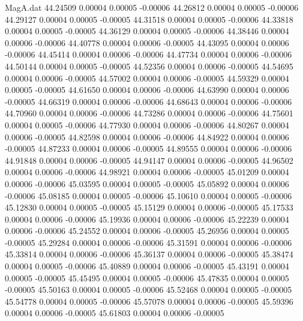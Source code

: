 \begin{filecontents}{MagA.dat}
  44.24509    0.00004    0.00005   -0.00006
  44.26812    0.00004    0.00005   -0.00006
  44.29127    0.00004    0.00005   -0.00005
  44.31518    0.00004    0.00005   -0.00006
  44.33818    0.00004    0.00005   -0.00005
  44.36129    0.00004    0.00005   -0.00006
  44.38446    0.00004    0.00006   -0.00006
  44.40778    0.00004    0.00006   -0.00005
  44.43095    0.00004    0.00006   -0.00006
  44.45414    0.00004    0.00006   -0.00006
  44.47734    0.00004    0.00006   -0.00006
  44.50144    0.00004    0.00005   -0.00005
  44.52356    0.00004    0.00006   -0.00005
  44.54695    0.00004    0.00006   -0.00005
  44.57002    0.00004    0.00006   -0.00005
  44.59329    0.00004    0.00005   -0.00005
  44.61650    0.00004    0.00006   -0.00006
  44.63990    0.00004    0.00006   -0.00005
  44.66319    0.00004    0.00006   -0.00006
  44.68643    0.00004    0.00006   -0.00006
  44.70960    0.00004    0.00006   -0.00006
  44.73286    0.00004    0.00006   -0.00006
  44.75601    0.00004    0.00005   -0.00006
  44.77930    0.00004    0.00006   -0.00006
  44.80267    0.00004    0.00006   -0.00005
  44.82598    0.00004    0.00006   -0.00006
  44.84922    0.00004    0.00006   -0.00005
  44.87233    0.00004    0.00006   -0.00005
  44.89555    0.00004    0.00006   -0.00006
  44.91848    0.00004    0.00006   -0.00005
  44.94147    0.00004    0.00006   -0.00005
  44.96502    0.00004    0.00006   -0.00006
  44.98921    0.00004    0.00006   -0.00005
  45.01209    0.00004    0.00006   -0.00006
  45.03595    0.00004    0.00005   -0.00005
  45.05892    0.00004    0.00006   -0.00006
  45.08185    0.00004    0.00005   -0.00006
  45.10610    0.00004    0.00005   -0.00006
  45.12830    0.00004    0.00005   -0.00005
  45.15129    0.00004    0.00006   -0.00005
  45.17533    0.00004    0.00006   -0.00006
  45.19936    0.00004    0.00006   -0.00006
  45.22239    0.00004    0.00006   -0.00006
  45.24552    0.00004    0.00006   -0.00005
  45.26956    0.00004    0.00005   -0.00005
  45.29284    0.00004    0.00006   -0.00006
  45.31591    0.00004    0.00006   -0.00006
  45.33814    0.00004    0.00006   -0.00006
  45.36137    0.00004    0.00006   -0.00005
  45.38474    0.00004    0.00005   -0.00006
  45.40889    0.00004    0.00006   -0.00005
  45.43191    0.00004    0.00005   -0.00005
  45.45495    0.00004    0.00005   -0.00006
  45.47835    0.00004    0.00005   -0.00005
  45.50163    0.00004    0.00005   -0.00006
  45.52468    0.00004    0.00005   -0.00005
  45.54778    0.00004    0.00005   -0.00006
  45.57078    0.00004    0.00006   -0.00005
  45.59396    0.00004    0.00006   -0.00005
  45.61803    0.00004    0.00006   -0.00005

\end{filecontents}
